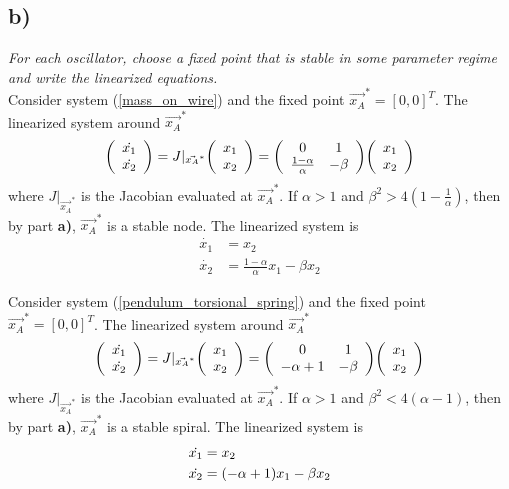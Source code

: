\documentclass[12pt]{article}
\begin{document}
\subsection*{ b)}
\emph{For each oscillator, choose a fixed point that is stable in some parameter regime and write the linearized equations.} \\

Consider system (\ref{mass_on_wire}) and the fixed point $\vec{x_A}^* = [0,0]^T$.  The linearized system around $\vec{x_A}^*$
\begin{align*}
    \qty(\begin{array}{c}\dot{x_1} \\ \dot{x_2}\end{array}) = J|_{\vec{x_A}^*}\qty(\begin{array}{c}x_1 \\ x_2\end{array}) = \qty(\begin{array}{cc}0 & 1 \\ \frac{1 - \alpha}{\alpha} & -\beta\end{array})\qty(\begin{array}{c}x_1 \\ x_2\end{array})
\end{align*}
where $J|_{\vec{x_A}^*}$ is the Jacobian evaluated at $\vec{x_A}^*$.  If $\alpha > 1$ and $\beta^2 > 4(1 - \frac{1}{\alpha})$, then by part \textbf{a)}, $\vec{x_A}^*$ is a stable node.  The linearized system is
\begin{align*}
    \dot{x_1} &= x_2 \\
    \dot{x_2} &= \frac{1 - \alpha}{\alpha}x_1 - \beta x_2
\end{align*}

Consider system (\ref{pendulum_torsional_spring}) and the fixed point $\vec{x_A}^* = [0,0]^T$.  The linearized system around $\vec{x_A}^*$
\begin{align*}
    \qty(\begin{array}{c}\dot{x_1} \\ \dot{x_2}\end{array}) = J|_{\vec{x_A}^*}\qty(\begin{array}{c}x_1 \\ x_2\end{array}) = \qty(\begin{array}{cc}0 & 1 \\ -\alpha + 1 & -\beta\end{array})\qty(\begin{array}{c}x_1 \\ x_2\end{array})
\end{align*}
where $J|_{\vec{x_A}^*}$ is the Jacobian evaluated at $\vec{x_A}^*$.  If $\alpha > 1$ and $\beta^2 < 4(\alpha - 1)$, then by part \textbf{a)}, $\vec{x_A}^*$ is a stable spiral.  The linearized system is
\begin{align*}
    \dot{x_1} &= x_2 \\
    \dot{x_2} &= \qty(-\alpha + 1)x_1 - \beta x_2
\end{align*}
\end{document}

